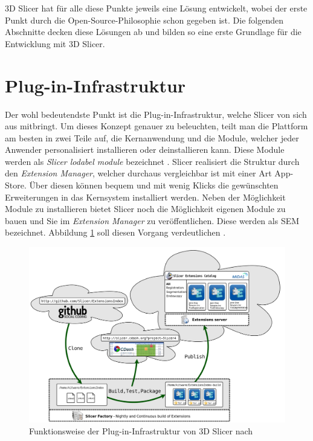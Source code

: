 3D Slicer hat für alle diese Punkte jeweils eine Lösung entwickelt, wobei der
erste Punkt durch die Open-Source-Philosophie schon gegeben ist. Die folgenden Abschnitte
decken diese Lösungen ab und bilden so eine erste Grundlage für die Entwicklung mit
3D Slicer.

\section{Plug-in-Infrastruktur}
Der wohl bedeutendste Punkt ist die Plug-in-Infrastruktur, welche Slicer von
sich aus mitbringt. Um dieses Konzept genauer zu beleuchten, teilt man die
Plattform am besten in zwei Teile auf, die Kernanwendung und die Module, welcher
jeder Anwender personalisiert installieren oder deinstallieren kann. Diese Module
werden als \textit{Slicer lodabel module} bezeichnet \citep[vgl.][S.~1332]{fedorov2012slicer}.
Slicer realisiert die Struktur durch den \textit{Extension Manager}, welcher
durchaus vergleichbar ist mit einer Art App-Store. Über diesen können bequem und
mit wenig Klicks die gewünschten Erweiterungen in das Kernsystem installiert werden.
Neben der Möglichkeit Module zu installieren bietet Slicer noch die Möglichkeit
eigenen Module zu bauen und Sie im \textit{Extension Manager} zu veröffentlichen.
Diese werden als \ac{SEM} bezeichnet. Abbildung
\ref{fig:3d_slicer_extension_index} soll diesen Vorgang verdeutlichen \citep[vgl.][]{slicer2024}.

\begin{figure}[h]
	\centering
	\includegraphics[width=0.7 \textwidth]{img/slicer_extention_index.png}
	\caption{Funktionsweise der Plug-in-Infrastruktur von 3D Slicer nach \citet{extensionsIndex2024}}
	\label{fig:3d_slicer_extension_index}
\end{figure}

